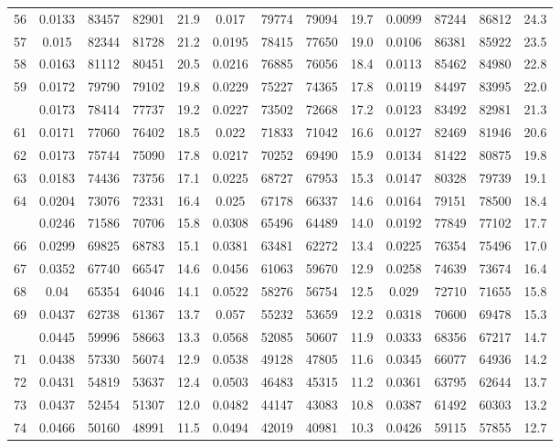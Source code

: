 \documentclass[
  14pt,
]{article}
\begin{document}
\begin{longtable}[t]{lcccccccccccc}
56 & 0.0133 & 83457 & 82901 & 21.9 & 0.017 & 79774 & 79094 & 19.7 & 0.0099 & 87244 & 86812 & 24.3\\
57 & 0.015 & 82344 & 81728 & 21.2 & 0.0195 & 78415 & 77650 & 19.0 & 0.0106 & 86381 & 85922 & 23.5\\
58 & 0.0163 & 81112 & 80451 & 20.5 & 0.0216 & 76885 & 76056 & 18.4 & 0.0113 & 85462 & 84980 & 22.8\\
59 & 0.0172 & 79790 & 79102 & 19.8 & 0.0229 & 75227 & 74365 & 17.8 & 0.0119 & 84497 & 83995 & 22.0\\
\addlinespace
60 & 0.0173 & 78414 & 77737 & 19.2 & 0.0227 & 73502 & 72668 & 17.2 & 0.0123 & 83492 & 82981 & 21.3\\
61 & 0.0171 & 77060 & 76402 & 18.5 & 0.022 & 71833 & 71042 & 16.6 & 0.0127 & 82469 & 81946 & 20.6\\
62 & 0.0173 & 75744 & 75090 & 17.8 & 0.0217 & 70252 & 69490 & 15.9 & 0.0134 & 81422 & 80875 & 19.8\\
63 & 0.0183 & 74436 & 73756 & 17.1 & 0.0225 & 68727 & 67953 & 15.3 & 0.0147 & 80328 & 79739 & 19.1\\
64 & 0.0204 & 73076 & 72331 & 16.4 & 0.025 & 67178 & 66337 & 14.6 & 0.0164 & 79151 & 78500 & 18.4\\
\addlinespace
65 & 0.0246 & 71586 & 70706 & 15.8 & 0.0308 & 65496 & 64489 & 14.0 & 0.0192 & 77849 & 77102 & 17.7\\
66 & 0.0299 & 69825 & 68783 & 15.1 & 0.0381 & 63481 & 62272 & 13.4 & 0.0225 & 76354 & 75496 & 17.0\\
67 & 0.0352 & 67740 & 66547 & 14.6 & 0.0456 & 61063 & 59670 & 12.9 & 0.0258 & 74639 & 73674 & 16.4\\
68 & 0.04 & 65354 & 64046 & 14.1 & 0.0522 & 58276 & 56754 & 12.5 & 0.029 & 72710 & 71655 & 15.8\\
69 & 0.0437 & 62738 & 61367 & 13.7 & 0.057 & 55232 & 53659 & 12.2 & 0.0318 & 70600 & 69478 & 15.3\\
\addlinespace
70 & 0.0445 & 59996 & 58663 & 13.3 & 0.0568 & 52085 & 50607 & 11.9 & 0.0333 & 68356 & 67217 & 14.7\\
71 & 0.0438 & 57330 & 56074 & 12.9 & 0.0538 & 49128 & 47805 & 11.6 & 0.0345 & 66077 & 64936 & 14.2\\
72 & 0.0431 & 54819 & 53637 & 12.4 & 0.0503 & 46483 & 45315 & 11.2 & 0.0361 & 63795 & 62644 & 13.7\\
73 & 0.0437 & 52454 & 51307 & 12.0 & 0.0482 & 44147 & 43083 & 10.8 & 0.0387 & 61492 & 60303 & 13.2\\
74 & 0.0466 & 50160 & 48991 & 11.5 & 0.0494 & 42019 & 40981 & 10.3 & 0.0426 & 59115 & 57855 & 12.7\\

\end{longtable}
\end{document}
